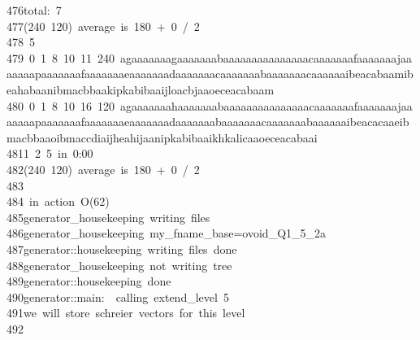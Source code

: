 \begin{tabbing}
476\>total:\ 7\\[0pt]
477\>(240\ 120)\ average\ is\ 180\ +\ 0\ /\ 2\\[0pt]
478\>\ 5\\[0pt]
479\ 0\ 1\ 8\ 10\ 11\ 240\ agaaaaaaagaaaaaaabaaaaaaaaaaaaaaacaaaaaaafaaaaaaajaaaaaaapaaaaaaafaaaaaaaeaaaaaaadaaaaaaacaaaaaaabaaaaaaacaaaaaaibeacabaamibeahabaanibmacbbaakipkabibaaijloacbjaaoeceacabaam\\[0pt]
480\ 0\ 1\ 8\ 10\ 16\ 120\ agaaaaaaahaaaaaaabaaaaaaaaaaaaaaacaaaaaaafaaaaaaajaaaaaaapaaaaaaafaaaaaaaeaaaaaaadaaaaaaabaaaaaaacaaaaaaabaaaaaaibeacacaaeibmacbbaaoibmaccdiaijheahijaanipkabibaaikhkalicaaoeceacabaai\\[0pt]
481\>1\ 2\ 5\ in\ 0:00\\[0pt]
482\>(240\ 120)\ average\ is\ 180\ +\ 0\ /\ 2\\[0pt]
483\>\\[0pt]
484\>\ in\ action\ O(62)\\[0pt]
485\>generator\_housekeeping\ writing\ files\\[0pt]
486\>generator\_housekeeping\ my\_fname\_base=ovoid\_Q1\_5\_2a\\[0pt]
487\>generator::housekeeping\ writing\ files\ done\\[0pt]
488\>generator\_housekeeping\ not\ writing\ tree\\[0pt]
489\>generator::housekeeping\ done\\[0pt]
490\>generator::main:\ \ calling\ extend\_level\ 5\\[0pt]
491\>we\ will\ store\ schreier\ vectors\ for\ this\ level\\[0pt]
492\>\\[0pt]

\end{tabbing}
